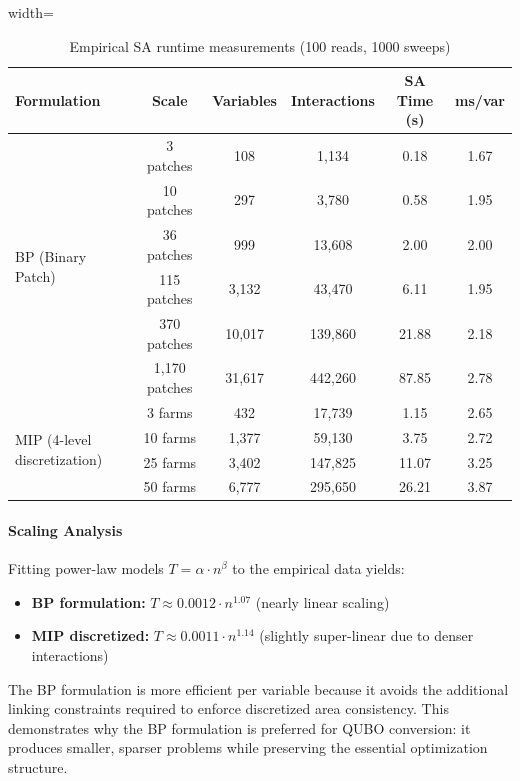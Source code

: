 \documentclass{oqireport}
\begin{document}
\begin{table}[H]
\centering
\caption{Empirical SA runtime measurements (100 reads, 1000 sweeps)}
\label{tab:sa_empirical}
\begin{adjustbox}{width=\textwidth}
\begin{tabular}{@{}lccccc@{}}
\toprule
\textbf{Formulation} & \textbf{Scale} & \textbf{Variables} & \textbf{Interactions} & \textbf{SA Time (s)} & \textbf{ms/var} \\
\midrule
\multirow{6}{*}{BP (Binary Patch)} 
 & 3 patches & 108 & 1,134 & 0.18 & 1.67 \\
 & 10 patches & 297 & 3,780 & 0.58 & 1.95 \\
 & 36 patches & 999 & 13,608 & 2.00 & 2.00 \\
 & 115 patches & 3,132 & 43,470 & 6.11 & 1.95 \\
 & 370 patches & 10,017 & 139,860 & 21.88 & 2.18 \\
 & 1,170 patches & 31,617 & 442,260 & 87.85 & 2.78 \\
\midrule
\multirow{4}{*}{MIP (4-level discretization)} 
 & 3 farms & 432 & 17,739 & 1.15 & 2.65 \\
 & 10 farms & 1,377 & 59,130 & 3.75 & 2.72 \\
 & 25 farms & 3,402 & 147,825 & 11.07 & 3.25 \\
 & 50 farms & 6,777 & 295,650 & 26.21 & 3.87 \\
\bottomrule
\end{tabular}
\end{adjustbox}
\end{table}

\paragraph{Scaling Analysis}

Fitting power-law models $T = \alpha \cdot n^\beta$ to the empirical data yields:
\begin{itemize}
    \item \textbf{BP formulation:} $T \approx 0.0012 \cdot n^{1.07}$ (nearly linear scaling)
    \item \textbf{MIP discretized:} $T \approx 0.0011 \cdot n^{1.14}$ (slightly super-linear due to denser interactions)
\end{itemize}

The BP formulation is more efficient per variable because it avoids the additional linking constraints required to enforce discretized area consistency. This demonstrates why the BP formulation is preferred for QUBO conversion: it produces smaller, sparser problems while preserving the essential optimization structure.
\end{document}
